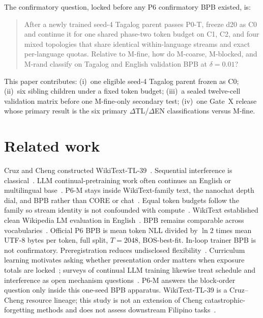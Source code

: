 \documentclass[11pt,a4paper]{article}
\begin{document}
The confirmatory question, locked before any P6 confirmatory BPB existed, is:

\begin{quote}
After a newly trained seed-4 Tagalog parent passes P0-T, freeze d20 as C0 and continue it for one shared phase-two token budget on C1, C2, and four mixed topologies that share identical within-language streams and exact per-language quotas. Relative to M-fine, how do M-coarse, M-blocked, and M-rand classify on Tagalog and English validation BPB at $\delta=0.01$?
\end{quote}

This paper contributes: (i)~one eligible seed-4 Tagalog parent frozen as C0; (ii)~six sibling children under a fixed token budget; (iii)~a sealed twelve-cell validation matrix before one M-fine-only secondary test; (iv)~one Gate~X release whose primary result is the six primary $\Delta$TL/$\Delta$EN classifications versus M-fine.

\section{Related work}
\label{sec:related}

Cruz and Cheng constructed WikiText-TL-39~\cite{cruz2019eval}. Sequential interference is classical~\cite{mccloskey1989catastrophic,french1999cf}. LLM continual-pretraining work often continues an English or multilingual base~\cite{luo2023forgetting,ramasesh2021forgetscale,shi2024continual}. P6-M stays inside WikiText-family text, the nanochat depth dial, and BPB rather than CORE or chat~\cite{karpathy2026nanochat}. Equal token budgets follow the family so stream identity is not confounded with compute~\cite{kaplan2020scaling,hoffmann2022chinchilla,muennighoff2023dataconstrained}. WikiText established clean Wikipedia LM evaluation in English~\cite{merity2017pointer}. BPB remains comparable across vocabularies~\cite{shannon1951prediction,brown2020gpt3}. Official P6 BPB is mean token NLL divided by $\ln 2$ times mean UTF-8 bytes per token, full split, $T=2048$, BOS-best-fit. In-loop trainer BPB is not confirmatory. Preregistration reduces undisclosed flexibility~\cite{nosek2018prereg,wagenmakers2012confirmatory}. Curriculum learning motivates asking whether presentation order matters when exposure totals are locked~\cite{bengio2009curriculum}; surveys of continual LLM training likewise treat schedule and interference as open mechanism questions~\cite{shi2024continual}. P6-M answers the block-order question only inside this one-seed BPB apparatus. WikiText-TL-39 is a Cruz--Cheng resource lineage; this study is not an extension of Cheng catastrophic-forgetting methods and does not assess downstream Filipino tasks~\cite{cruz2020degradation}.
\end{document}
